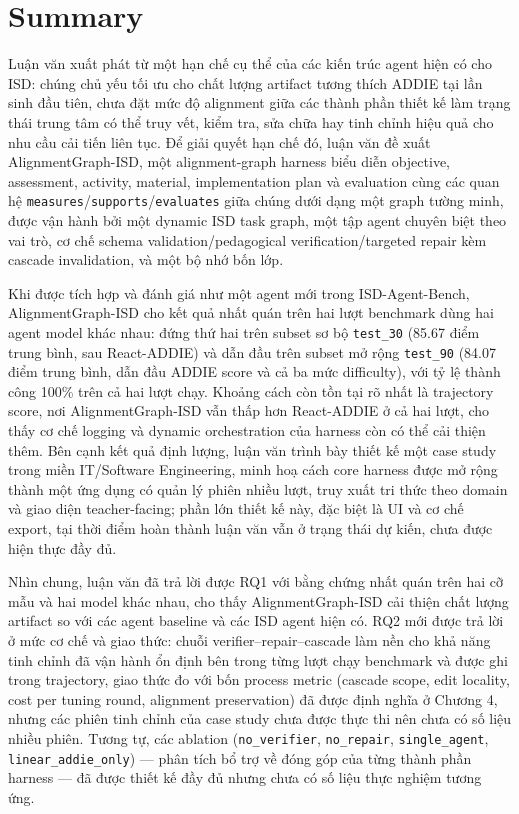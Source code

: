 \documentclass[../main.tex]{subfiles}
\begin{document}
\section{Summary}

Luận văn xuất phát từ một hạn chế cụ thể của các kiến trúc agent hiện có cho ISD: chúng chủ yếu tối ưu cho chất lượng artifact tương thích ADDIE tại lần sinh đầu tiên, chưa đặt mức độ alignment giữa các thành phần thiết kế làm trạng thái trung tâm có thể truy vết, kiểm tra, sửa chữa hay tinh chỉnh hiệu quả cho nhu cầu cải tiến liên tục. Để giải quyết hạn chế đó, luận văn đề xuất AlignmentGraph-ISD, một alignment-graph harness biểu diễn objective, assessment, activity, material, implementation plan và evaluation cùng các quan hệ \texttt{measures}/\texttt{supports}/\texttt{evaluates} giữa chúng dưới dạng một graph tường minh, được vận hành bởi một dynamic ISD task graph, một tập agent chuyên biệt theo vai trò, cơ chế schema validation/pedagogical verification/targeted repair kèm cascade invalidation, và một bộ nhớ bốn lớp.

Khi được tích hợp và đánh giá như một agent mới trong ISD-Agent-Bench, AlignmentGraph-ISD cho kết quả nhất quán trên hai lượt benchmark dùng hai agent model khác nhau: đứng thứ hai trên subset sơ bộ \texttt{test\_30} (85.67 điểm trung bình, sau React-ADDIE) và dẫn đầu trên subset mở rộng \texttt{test\_90} (84.07 điểm trung bình, dẫn đầu ADDIE score và cả ba mức difficulty), với tỷ lệ thành công 100\% trên cả hai lượt chạy. Khoảng cách còn tồn tại rõ nhất là trajectory score, nơi AlignmentGraph-ISD vẫn thấp hơn React-ADDIE ở cả hai lượt, cho thấy cơ chế logging và dynamic orchestration của harness còn có thể cải thiện thêm. Bên cạnh kết quả định lượng, luận văn trình bày thiết kế một case study trong miền IT/Software Engineering, minh hoạ cách core harness được mở rộng thành một ứng dụng có quản lý phiên nhiều lượt, truy xuất tri thức theo domain và giao diện teacher-facing; phần lớn thiết kế này, đặc biệt là UI và cơ chế export, tại thời điểm hoàn thành luận văn vẫn ở trạng thái dự kiến, chưa được hiện thực đầy đủ.

Nhìn chung, luận văn đã trả lời được RQ1 với bằng chứng nhất quán trên hai cỡ mẫu và hai model khác nhau, cho thấy AlignmentGraph-ISD cải thiện chất lượng artifact so với các agent baseline và các ISD agent hiện có. RQ2 mới được trả lời ở mức cơ chế và giao thức: chuỗi verifier--repair--cascade làm nền cho khả năng tinh chỉnh đã vận hành ổn định bên trong từng lượt chạy benchmark và được ghi trong trajectory, giao thức đo với bốn process metric (cascade scope, edit locality, cost per tuning round, alignment preservation) đã được định nghĩa ở Chương 4, nhưng các phiên tinh chỉnh của case study chưa được thực thi nên chưa có số liệu nhiều phiên. Tương tự, các ablation (\texttt{no\_verifier}, \texttt{no\_repair}, \texttt{single\_agent}, \texttt{linear\_addie\_only}) — phân tích bổ trợ về đóng góp của từng thành phần harness — đã được thiết kế đầy đủ nhưng chưa có số liệu thực nghiệm tương ứng.
\end{document}
